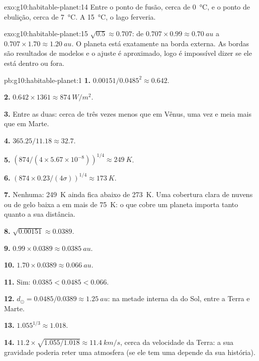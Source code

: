 \begin{solution}{exo:g10:habitable-planet:14}
Entre o ponto de fusão, cerca de \qty{0}{\degreeCelsius}, e o ponto de
ebulição, cerca de \qty{7}{\degreeCelsius}. A \qty{15}{\degreeCelsius}, o
lago ferveria.
\end{solution}

\begin{solution}{exo:g10:habitable-planet:15}
$\sqrt{0.5} \approx 0.707$: de $0.707 \times 0.99 \approx \qty{0.70}{au}$
a $0.707 \times 1.70 \approx \qty{1.20}{au}$. O planeta está exatamente na
borda externa. As bordas são resultados de modelos e o ajuste é
aproximado, logo é impossível dizer se ele está dentro ou fora.
\end{solution}

\begin{solution}{pb:g10:habitable-planet:1}
\textbf{1.} $0.00151/0.0485^2 \approx 0.642$.

\textbf{2.} $0.642 \times 1361 \approx \qty{874}{W/m^2}$.

\textbf{3.} Entre as duas: cerca de três vezes menos que em Vênus, uma vez
e meia mais que em Marte.

\textbf{4.} $365.25/11.18 \approx 32.7$.

\textbf{5.} $(874/(4 \times 5.67\times10^{-8}))^{1/4} \approx \qty{249}{K}$.

\textbf{6.} $(874 \times 0.23/(4\sigma))^{1/4} \approx \qty{173}{K}$.

\textbf{7.} Nenhuma: \qty{249}{K} ainda fica abaixo de \qty{273}{K}. Uma
cobertura clara de nuvens ou de gelo baixa a  em
mais de \qty{75}{K}: o que cobre um planeta importa tanto quanto a sua
distância.

\textbf{8.} $\sqrt{0.00151} \approx 0.0389$.

\textbf{9.} $0.99 \times 0.0389 \approx \qty{0.0385}{au}$.

\textbf{10.} $1.70 \times 0.0389 \approx \qty{0.066}{au}$.

\textbf{11.} Sim: $0.0385 < 0.0485 < 0.066$.

\textbf{12.} $d_\odot = 0.0485/0.0389 \approx \qty{1.25}{au}$: na metade
interna da  do Sol, entre a Terra e Marte.

\textbf{13.} $1.055^{1/3} \approx 1.018$.

\textbf{14.} $11.2 \times \sqrt{1.055/1.018} \approx \qty{11.4}{km/s}$,
cerca da velocidade da Terra: a sua gravidade poderia reter uma atmosfera
(se ele tem uma depende da sua história).


\end{solution}
